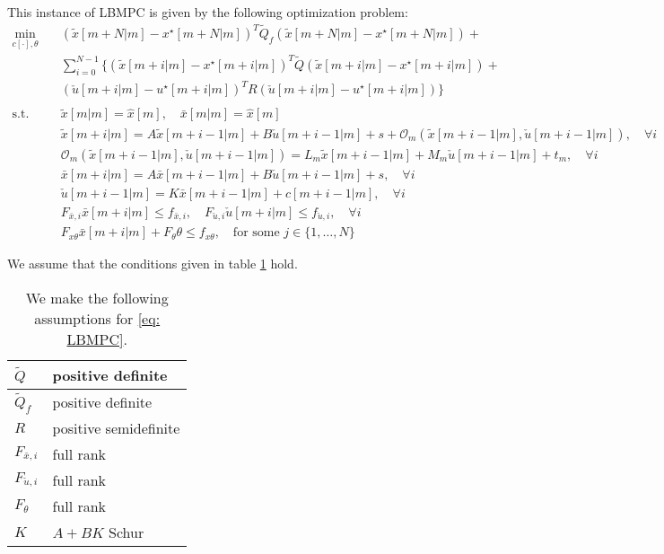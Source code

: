 \documentclass[letter]{article}
\begin{document}
\begin{sffamily}
\noindent
This instance of LBMPC is given by the following optimization problem:
\begin{align}\label{eq: LBMPC}
	\min_{c[\cdot],\theta} \quad & (\tilde{x}[m+N|m]-x^\star[m+N|m])^T \tilde{Q}_f (\tilde{x}[m+N|m]-x^\star[m+N|m]) + \\
	&  \sum_{i=0} ^ {N-1} \{ (\tilde{x}[m+i|m]-x^\star[m+i|m])^T \tilde{Q} (\tilde{x}[m+i|m]-x^\star[m+i|m]) + \nonumber \\
	& (\check{u}[m+i|m]-u^\star[m+i|m])^T R (\check{u}[m+i|m]-u^\star[m+i|m]) \}  \nonumber \\	
		\nonumber \\		
	\text{s.t.} \quad & \tilde{x}[m|m] = \hat{x}[m],\quad \bar{x}[m|m] = \hat{x}[m] \nonumber \\
		&  \tilde{x}[m+i|m]= A \tilde{x}[m+i-1|m] + B \check{u}[m+i-1|m] + s + \mathcal{O}_m(\tilde{x}[m+i-1|m],\check{u}[m+i-1|m]), \quad \forall i \nonumber\\
		& \mathcal{O}_m(\tilde{x}[m+i-1|m],\check{u}[m+i-1|m]) = L_m \tilde{x}[m+i-1|m] + M_m \check{u}[m+i-1|m] + t_m, \quad \forall i \nonumber \\
	 &	\bar{x}[m+i|m]= A \bar{x}[m+i-1|m] + B \check{u}[m+i-1|m]+s, \quad \forall i \nonumber\\
	 & \check{u}[m+i-1|m] = K\bar{x}[m+i-1|m] + c[m+i-1|m], \quad \forall i \nonumber \\
	 & F_{\bar{x},i}\bar{x}[m+i|m] \leq f_{\bar{x},i}, \quad F_{\check{u},i}\check{u}[m+i|m] \leq f_{\check{u},i}, \quad \forall i \nonumber \\
	 & F_{x\theta}\bar{x}[m+i|m] + F_\theta \theta \leq f_{x\theta},\quad \text{for some } j\in\{1,\ldots, N\} \nonumber
\end{align}

\noindent
We assume that the conditions given in table \ref{tab: matrix assumptions} hold. \\

\begin{table}[!htdp]
\caption{We make the following assumptions for \eqref{eq: LBMPC}.}
\begin{center}
\begin{tabular}{|l|l|}\hline
 $\tilde{Q}$ & positive definite\\ \hline
 $\tilde{Q}_f$ & positive definite\\ \hline
 $R$ & positive semidefinite \\ \hline
 $F_{\bar{x},i}$ & full rank \\ \hline
 $F_{\check{u},i}$ & full rank \\ \hline
 $F_\theta$ & full rank \\ \hline
 $K$ & $A+BK$ Schur \\ \hline
\end{tabular}
\end{center}
\label{tab: matrix assumptions}
\end{table}



\end{sffamily}
\end{document}

